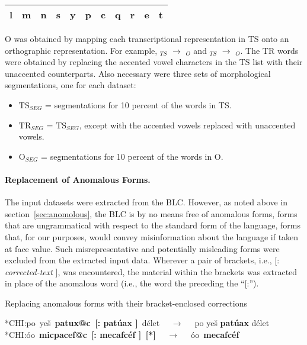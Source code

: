 \begin{table}[ht]
\begin{tabular}{c c c c c c c c c c c}
          l & m &
	n & s & y & p & c & q & r & e & t \\
\bottomrule
\end{tabular}
\end{table}
O was obtained by mapping each transcriptional representation 
in TS onto an orthographic representation. For example, $_{TS}$ $\to$
$_{O}$ and $_{TS}$ $\to$ $_{O}$. 
The TR words were obtained by 
replacing the accented vowel characters in the TS list with their unaccented counterparts.
Also necessary were three sets of morphological segmentations, one for each dataset: %
\begin{itemize}
\item $\text{TS}_{SEG}$ = segmentations for 10 percent of the words in TS.
\item $\text{TR}_{SEG}$ = $\text{TS}_{SEG}$, except with the accented vowels replaced
with unaccented vowels.
\item  $\text{O}_{SEG}$ = segmentations for 10 percent of the words in O.
\end{itemize} 

\paragraph{Replacement of Anomalous Forms.} 
The input datasets were extracted from the BLC. However, as noted above in 
section~\ref{sec:anomolous}, the BLC is by no means free of anomalous forms, 
forms that are ungrammatical with respect to the standard form of the language, 
forms that, for our purposes, would convey misinformation about the language if taken at face value. 
Such misrepresentative and potentially misleading forms were excluded from the 
extracted input data.  
Wherever a pair of brackets, i.e., \textsf{[: \textit{corrected-text} ]}, was encountered, 
the material within the brackets was extracted in place of the anomalous word (i.e., the 
word the preceding the ``\textsf{[:}'').

\begin{exe}
	\ex Replacing anomalous forms with their bracket-enclosed corrections
	\begin{xlist} \label{ex:replace}
	   \ex \textsf{*CHI:}\quad\textsf{po\, ye\v{s}\, \textbf{patux@c\, [: pat\'{u}ax ]}\, d\'{e}let} $\quad\to\quad$
	   \textsf{po ye\v{s} \textbf{pat\'{u}ax} d\'{e}let} 
	   \ex \textsf{*CHI:}\quad\textsf{\textglotstop\'{o}o\, \textbf{micpacef@c}\, \textbf{[: mecafc\'ef ]\, [*]}} $\quad\to\quad$ \textsf{\textglotstop\'oo\, \textbf{mecafc\'ef}}
	\end{xlist}
\end{exe} 

